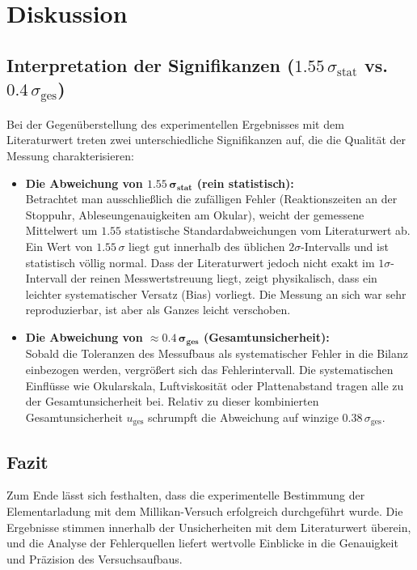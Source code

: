 \documentclass[12pt,a4paper,titlepage]{scrartcl}
\numberwithin{equation}{section}
\numberwithin{table}{section}
\numberwithin{figure}{section}
\begin{document}
\section{Diskussion}
\subsection{Interpretation der Signifikanzen ($1.55\,\sigma_{\text{stat}}$ vs. $0.4\,\sigma_{\text{ges}}$)}

Bei der Gegenüberstellung des experimentellen Ergebnisses mit dem Literaturwert treten zwei unterschiedliche Signifikanzen
auf, die die Qualität der Messung charakterisieren:

\begin{itemize}
    \item \textbf{Die Abweichung von $\mathbf{1.55\,\sigma_{\text{stat}}}$ (rein statistisch):} \\
    Betrachtet man ausschließlich die zufälligen Fehler (Reaktionszeiten an der Stoppuhr, Ableseungenauigkeiten am Okular), weicht der gemessene Mittelwert um $1.55$ statistische Standardabweichungen vom Literaturwert ab. Ein Wert von $1.55\,\sigma$ liegt gut innerhalb des üblichen $2\sigma$-Intervalls und ist statistisch völlig normal. Dass der Literaturwert jedoch nicht exakt im $1\sigma$-Intervall der reinen Messwertstreuung liegt, zeigt physikalisch, dass ein leichter systematischer Versatz (Bias) vorliegt. Die Messung an sich war sehr reproduzierbar, ist aber als Ganzes leicht verschoben.
    
    \item \textbf{Die Abweichung von $\mathbf{\approx 0.4\,\sigma_{\text{ges}}}$ (Gesamtunsicherheit):} \\
    Sobald die Toleranzen des Messufbaus als systematischer Fehler in die Bilanz einbezogen werden, vergrößert sich das Fehlerintervall. Die systematischen Einflüsse wie Okularskala, Luftviskosität oder Plattenabstand tragen alle zu der Gesamtunsicherheit bei. Relativ zu dieser kombinierten Gesamtunsicherheit $u_{\text{ges}}$ schrumpft die Abweichung auf winzige $0.38\,\sigma_{\text{ges}}$.
\end{itemize}

\medskip
\noindent

\subsection{Fazit}
Zum Ende lässt sich festhalten, dass die experimentelle Bestimmung der Elementarladung mit dem Millikan-Versuch erfolgreich durchgeführt wurde. Die Ergebnisse stimmen innerhalb der Unsicherheiten mit dem Literaturwert überein, und die Analyse der Fehlerquellen liefert wertvolle Einblicke in die Genauigkeit und Präzision des Versuchsaufbaus.
\end{document}
